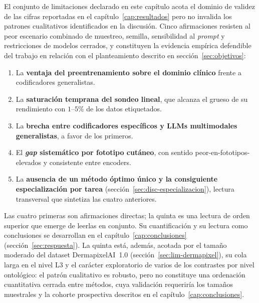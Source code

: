 El conjunto de limitaciones declarado en este capítulo acota el
dominio de validez de las cifras reportadas en el
capítulo~\ref{cap:resultados} pero no invalida los patrones
cualitativos identificados en la discusión. Cinco afirmaciones resisten
al peor escenario combinado de muestreo, semilla, sensibilidad al
\emph{prompt} y restricciones de modelos cerrados, y constituyen la
evidencia empírica defendible del trabajo en relación con el
planteamiento descrito en sección~\ref{sec:objetivos}:

\begin{enumerate}
  \item La \textbf{ventaja del preentrenamiento sobre el dominio
  clínico} frente a codificadores generalistas.
  \item La \textbf{saturación temprana del sondeo lineal}, que alcanza
  el grueso de su rendimiento con $1$--$5\%$ de los datos etiquetados.
  \item La \textbf{brecha entre codificadores específicos y LLMs
  multimodales generalistas}, a favor de los primeros.
  \item El \textbf{\emph{gap} sistemático por fototipo cutáneo}, con
  sentido peor-en-fototipos-elevados y consistente entre encoders.
  \item La \textbf{ausencia de un método óptimo único y la consiguiente
  especialización por tarea} (sección~\ref{sec:disc-especializacion}),
  lectura transversal que sintetiza las cuatro anteriores.
\end{enumerate}

Las cuatro primeras son afirmaciones directas; la quinta es una lectura
de orden superior que emerge de leerlas en conjunto. Su cuantificación y
su lectura como conclusiones se desarrollan en el
capítulo~\ref{cap:conclusiones} (sección~\ref{sec:respuesta}). La quinta
está, además, acotada por el tamaño moderado del dataset
DermapixelAI~1.0 (sección~\ref{sec:lim-dermapixel}), su cola larga en el
nivel L3 y el carácter exploratorio de varios de los contrastes por
nivel ontológico: el patrón cualitativo es robusto, pero no constituye
una ordenación cuantitativa cerrada entre métodos, cuya validación
requeriría los tamaños muestrales y la cohorte prospectiva descritos en
el capítulo~\ref{cap:conclusiones}.

